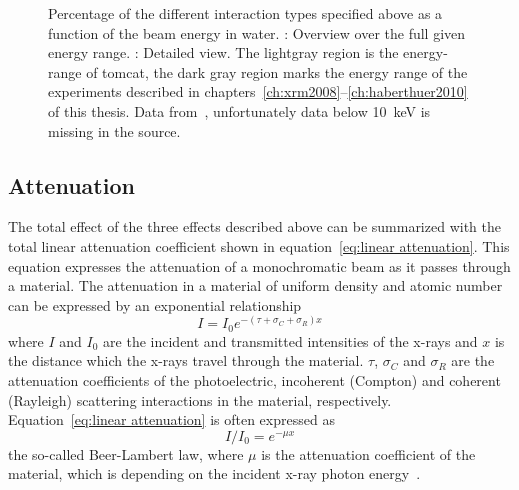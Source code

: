 \def\width{0.5\linewidth}%
\def\height{0.309\linewidth}%
\begin{figure}
	\noindent{}%
	\caption[Interaction types]{Percentage of the different interaction types specified above as a function of the beam energy in water. : Overview over the full given energy range. : Detailed view. The lightgray region is the energy-range of \ac{tomcat}, the dark gray region marks the energy range of the experiments described in chapters~\ref{ch:xrm2008}--\ref{ch:haberthuer2010} of this thesis. Data from~\citet[Table 5-5]{Johns1983}, unfortunately data below \SI{10}{\kilo\electronvolt} is missing in the source.}%
	\label{fig:InteractionPercentage}%
\end{figure}

\subsection{Attenuation}
The total effect of the three effects described above can be summarized with the total linear attenuation coefficient shown in equation~\ref{eq:linear attenuation}. This equation expresses the attenuation of a monochromatic beam as it passes through a material. The attenuation in a material of uniform density and atomic number can be expressed by an exponential relationship%
\begin{equation}%
	I=I_{0}e^{-(\tau+\sigma_{C}+\sigma_{R})x}%
	\label{eq:linear attenuation}%
\end{equation}%
where $I$ and $I_{0}$ are the incident and transmitted intensities of the x-rays and $x$ is the distance which the x-rays travel through the material. $\tau$, $\sigma_{C}$ and $\sigma_{R}$ are the attenuation coefficients of the photoelectric, incoherent (Compton) and coherent (Rayleigh) scattering interactions in the material, respectively. Equation~\ref{eq:linear attenuation} is often expressed as
\begin{equation}
	I/I_{0}=e^{-\mu x}
	\label{eq:beer-lambert}
\end{equation}%
the so-called Beer-Lambert law, where $\mu$ is the attenuation coefficient of the material, which is depending on the incident x-ray photon energy~\cite{Hsieh2003}. 

